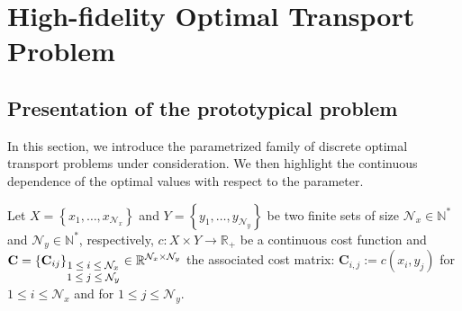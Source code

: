 \documentclass{article}
\def\RR{\mathbb{R}}
\def\N{\mathbb{N}}
\def\cN{\mathcal{N}}
\def\CC{\mathbf{C}}
\begin{document}
\section{High-fidelity Optimal Transport Problem}\label{section: High-fidelity model}


\subsection{Presentation of the prototypical problem}
%

In this section, we introduce the parametrized family of discrete optimal transport problems under consideration. We then highlight the continuous dependence of the optimal values with respect to the parameter.

Let $X= \left\lbrace x_1, \dots , x_{\cN_x}\right\rbrace$ and $Y = \left\lbrace y_1, \dots, y_{\cN_y}\right\rbrace$ be two finite sets of size $\cN_x \in \N ^*$ and $\cN_y \in \N^*$, respectively,  $c:X\times Y\rightarrow \RR_+$ be a continuous  cost function and $\displaystyle{\CC = \left\lbrace \CC_{ij} \right\rbrace_{\footnotesize \begin{matrix} 1 \leq i \leq \cN_x \\ 1\leq j \leq \cN_y \end{matrix}} \in \RR^{\cN_x \times \cN_y}}$ the associated cost matrix: $\CC_{i, j}:= c(x_i, y_j) $ for $1\leq i \leq \cN_x$ and for $1\leq j\leq \cN_y$.  
\end{document}
